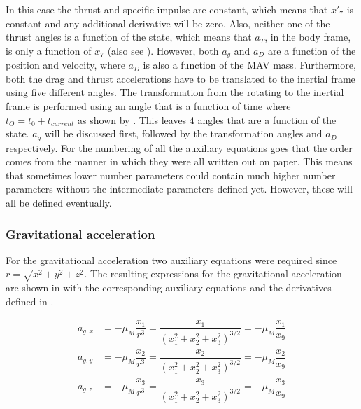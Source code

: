 In this case the thrust and specific impulse are constant, which means that $x'_{7}$ is constant and any additional derivative will be zero. Also, neither one of the thrust angles is a function of the state, which means that $a_{T}$, in the body frame, is only a function of $x_{7}$ (also see ). However, both $a_{g}$ and $a_{D}$ are a function of the position and velocity, where $a_{D}$ is also a function of the \ac{MAV} mass. Furthermore, both the drag and thrust accelerations have to be translated to the inertial frame using five different angles. The transformation from the rotating to the inertial frame is performed using an angle that is a function of time where $t_{O}=t_{0}+t_{current}$ as shown by . This leaves 4 angles that are a function of the state. $a_{g}$ will be discussed first, followed by the transformation angles and $a_{D}$ respectively. For the numbering of all the auxiliary equations goes that the order comes from the manner in which they were all written out on paper. This means that sometimes lower number parameters could contain much higher number parameters without the intermediate parameters defined yet. However, these will all be defined eventually.


\subsubsection{Gravitational acceleration}
 \label{subsubsec:tsiGravity} 
 For the gravitational acceleration two auxiliary equations were required since $r=\sqrt{x^{2}+y^{2}+z^{2}}$. The resulting expressions for the gravitational acceleration are shown in  with the corresponding auxiliary equations and the derivatives defined in .
 
 \begin{equation} \label{eq:gravAcc}
\begin{split}
a_{g,x} &= -\mu_{M}\dfrac{x_{1}}{r^{3}} = \dfrac{x_{1}}{\left(x_{1}^{2}+x_{2}^{2}+x_{3}^{2} \right)^{3/2}}=-\mu_{M}\dfrac{x_{1}}{x_{9}}\\
a_{g,y} &= -\mu_{M}\dfrac{x_{2}}{r^{3}} = \dfrac{x_{2}}{\left(x_{1}^{2}+x_{2}^{2}+x_{3}^{2} \right)^{3/2}}=-\mu_{M}\dfrac{x_{2}}{x_{9}}\\
a_{g,z} &= -\mu_{M}\dfrac{x_{3}}{r^{3}} = \dfrac{x_{3}}{\left(x_{1}^{2}+x_{2}^{2}+x_{3}^{2} \right)^{3/2}}=-\mu_{M}\dfrac{x_{3}}{x_{9}}
\end{split}
\end{equation}

